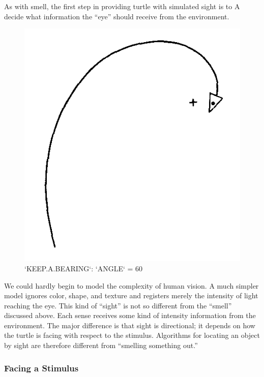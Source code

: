 \documentclass{book}
\begin{document}
As with smell, the first step in providing turtle with simulated sight is to
A decide what information the ``eye'' should receive from the environment.

\begin{figure}
\begin{center}
\includegraphics[scale=1]{fig2-6}
\caption{\textsc{`KEEP.A.BEARING`}: \textsc{`ANGLE`} = 60}
\end{center}
\end{figure}

We could hardly begin to model the complexity of human vision. A much
simpler model ignores color, shape, and texture and registers merely the
intensity of light reaching the eye. This kind of ``sight'' is not so different
from the ``smell'' discussed above. Each sense receives some kind of
intensity information from the environment. The major difference is
that sight is directional; it depends on how the turtle is facing with
respect to the stimulus. Algorithms for locating an object by sight are
therefore different from ``smelling something out.''

\subsubsection{Facing a Stimulus}
\end{document}
